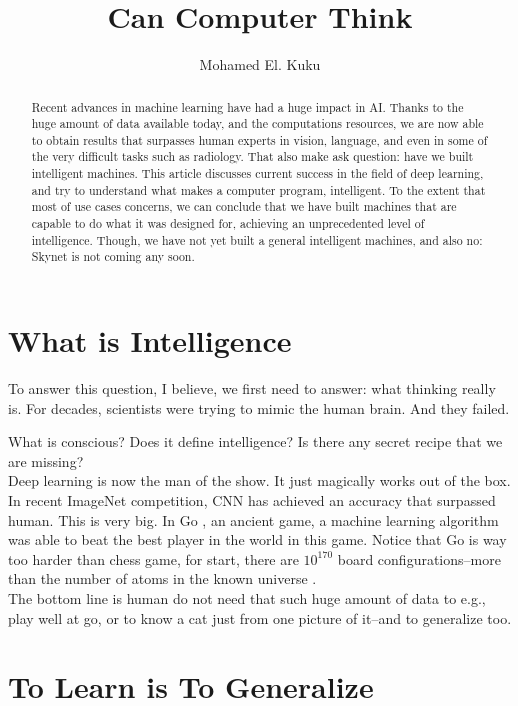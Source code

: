 \documentclass[]{article}
\title{Can Computer Think}
\author{Mohamed El. Kuku}
\begin{document}
\maketitle

\begin{abstract}
Recent advances in machine learning  have had a huge impact in AI. Thanks to the huge
amount of data available today, and the computations resources,
we are now able to obtain results that surpasses human experts in vision,
language, and even in some of the very difficult tasks such as radiology. That
also make ask question: have we built intelligent machines. This article
discusses current success in the field of deep learning, and try to understand
what makes a computer program, intelligent.
To the extent that most of use cases concerns, we can conclude that we have
built machines that are capable to do what it was designed for, achieving an
unprecedented level of intelligence. Though, we have not yet built a general
intelligent machines, and also no: Skynet is not coming any soon.
\end{abstract}

\section{What is Intelligence}

To answer this question, I believe, we first need to answer: what thinking really is. For decades, scientists were trying to mimic the human brain. And they failed. 

What is conscious? Does it define intelligence? Is there any secret recipe that
we are missing?\\

Deep learning is now the man of the show. It just magically works out of the
box. In recent ImageNet \cite{imagenet-competition} competition, CNN \cite{imagenet} has
achieved an accuracy that surpassed human. This is very big. In Go \cite{wiki:go}, an
ancient game, a machine learning algorithm was able to beat the best player in
the world in this game. Notice that Go is way too harder than chess game, for
start, there are $10^{170}$ board configurations--more than the number of atoms in
the known universe \cite{wiki:go}.\\

The bottom line is human do not need that such huge amount of data to e.g., play
well at go, or to know a cat just from one picture of it--and to generalize too.

\section{To Learn is To Generalize}
\end{document}
